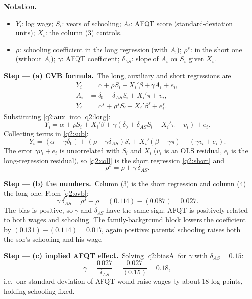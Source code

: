 \documentclass[11pt,a4paper]{article}
\newenvironment{notacao}{\par\smallskip\noindent\textbf{Notation.}\begin{itemize}[leftmargin=1.4em,topsep=1pt,itemsep=0pt]\small}{\end{itemize}}
\newcommand{\passo}[2]{\par\smallskip\noindent\textbf{Step --- #1.}~#2}
\begin{document}
\begin{sol}
\begin{notacao}
\item $Y_i$: log wage; $S_i$: years of schooling; $A_i$: AFQT score (standard-deviation units);
$X_i$: the column (3) controls.
\item $\rho$: schooling coefficient in the long regression (with $A_i$); $\rho^s$: in the short one
(without $A_i$); $\gamma$: AFQT coefficient; $\delta_{AS}$: slope of $A_i$ on $S_i$ given $X_i$.
\end{notacao}

\passo{(a) OVB formula}{The long, auxiliary and short regressions are
\begin{align}
Y_i&=\alpha+\rho S_i+X_i'\beta+\gamma A_i+e_i,\label{q2:long}\\
A_i&=\delta_0+\delta_{AS}S_i+X_i'\pi+v_i,\label{q2:aux}\\
Y_i&=\alpha^s+\rho^sS_i+X_i'\beta^s+e^s_i.\label{q2:short}
\end{align}
Substituting \eqref{q2:aux} into \eqref{q2:long}:
\begin{equation}
Y_i=\alpha+\rho S_i+X_i'\beta+\gamma\left(\delta_0+\delta_{AS}S_i+X_i'\pi+v_i\right)+e_i.\label{q2:sub}
\end{equation}
Collecting terms in \eqref{q2:sub}:
\begin{equation}
Y_i=(\alpha+\gamma\delta_0)+(\rho+\gamma\delta_{AS})S_i+X_i'(\beta+\gamma\pi)+(\gamma v_i+e_i).\label{q2:coll}
\end{equation}
The error $\gamma v_i+e_i$ is uncorrelated with $S_i$ and $X_i$ ($v_i$ is an OLS residual, $e_i$ is the
long-regression residual), so \eqref{q2:coll} is the short regression \eqref{q2:short} and
\begin{equation}
\rho^s=\rho+\gamma\,\delta_{AS}.\label{q2:ovb}
\end{equation}}

\passo{(b) the numbers}{Column (3) is the short regression and column (4) the long one. From \eqref{q2:ovb}:
\begin{equation}
\gamma\,\delta_{AS}=\rho^s-\rho=(0.114)-(0.087)=0.027.\label{q2:biasA}
\end{equation}
The bias is positive, so $\gamma$ and $\delta_{AS}$ have the same sign: AFQT is positively related to both
wages and schooling. The family-background block lowers the coefficient by $(0.131)-(0.114)=0.017$, again
positive: parents' schooling raises both the son's schooling and his wage.}

\passo{(c) implied AFQT effect}{Solving \eqref{q2:biasA} for $\gamma$ with $\delta_{AS}=0.15$:
\begin{equation}
\gamma=\frac{0.027}{\delta_{AS}}=\frac{0.027}{(0.15)}=0.18,\label{q2:gamma}
\end{equation}
i.e.\ one standard deviation of AFQT would raise wages by about 18 log points, holding schooling fixed.}


\end{sol}
\end{document}
